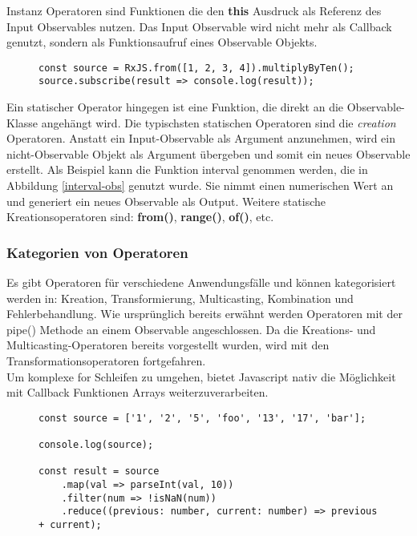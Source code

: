 \noindent
Instanz Operatoren sind Funktionen die den \textbf{this} Ausdruck als Referenz des Input Observables nutzen. Das Input Observable wird nicht mehr als Callback genutzt, sondern als Funktionsaufruf eines Observable Objekts.

\begin{figure}[H]
\begin{lstlisting}[basicstyle=\small]
const source = RxJS.from([1, 2, 3, 4]).multiplyByTen();
source.subscribe(result => console.log(result));
\end{lstlisting}
\end{figure}

\noindent
Ein statischer Operator hingegen ist eine Funktion, die direkt an die Observable-Klasse angehängt wird. Die typischsten statischen Operatoren sind die \textit{creation} Operatoren. Anstatt ein Input-Observable als Argument anzunehmen, wird ein nicht-Observable Objekt als Argument übergeben und somit ein neues Observable erstellt. Als Beispiel kann die Funktion interval genommen werden, die in Abbildung \ref{interval-obs} genutzt wurde. Sie nimmt einen numerischen Wert an und generiert ein neues Observable als Output. Weitere statische Kreationsoperatoren sind: \textbf{from()}, \textbf{range()}, \textbf{of()}, etc.

\subsubsection{Kategorien von Operatoren}

Es gibt Operatoren für verschiedene Anwendungsfälle und können kategorisiert werden in: Kreation, Transformierung, Multicasting, Kombination und Fehlerbehandlung. Wie ursprünglich bereits erwähnt werden Operatoren mit der pipe() Methode an einem Observable angeschlossen. Da die Kreations- und Multicasting-Operatoren bereits vorgestellt wurden, wird mit den Transformationsoperatoren fortgefahren.\\

\noindent
Um komplexe for Schleifen zu umgehen, bietet Javascript nativ die Möglichkeit mit Callback Funktionen Arrays weiterzuverarbeiten.

\begin{figure}[H]
\begin{lstlisting}[basicstyle=\small]
const source = ['1', '2', '5', 'foo', '13', '17', 'bar'];

console.log(source);

const result = source
    .map(val => parseInt(val, 10))
    .filter(num => !isNaN(num))
    .reduce((previous: number, current: number) => previous + current);
\end{lstlisting}
\end{figure}

